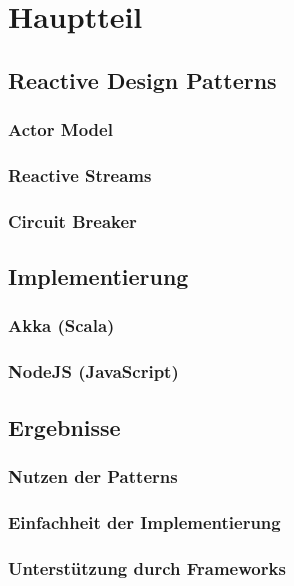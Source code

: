 \chapter{Hauptteil}

\section{Reactive Design Patterns}
\subsection{Actor Model}
\subsection{Reactive Streams}
\subsection{Circuit Breaker}

\section{Implementierung}
\subsection{Akka (Scala)}
\subsection{NodeJS (JavaScript)}

\section{Ergebnisse}
\subsection{Nutzen der Patterns}
\subsection{Einfachheit der Implementierung}
\subsection{Unterstützung durch Frameworks}
